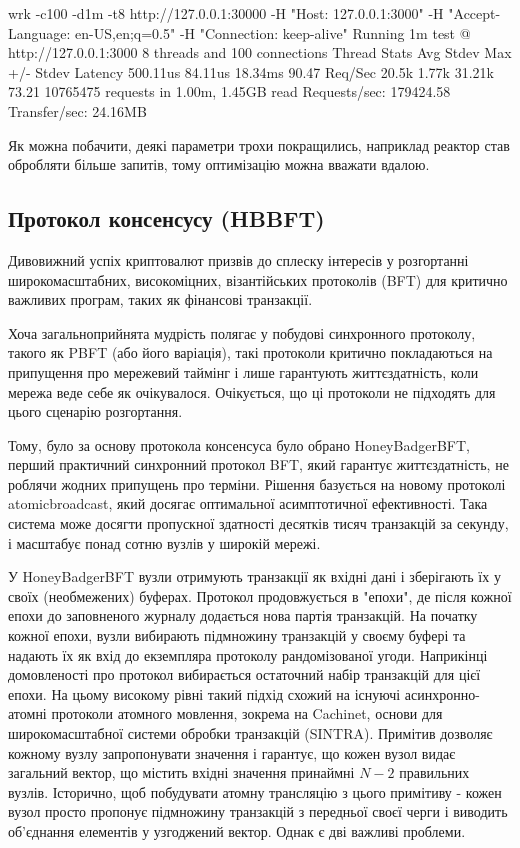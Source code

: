 \documentclass{lib/styles/default-style}
\begin{document}
    \begin{snippet}
        wrk -c100 -d1m -t8 http://127.0.0.1:30000 -H "Host: 127.0.0.1:3000" -H "Accept-Language: en-US,en;q=0.5" -H "Connection: keep-alive"
        Running 1m test @ http://127.0.0.1:3000
        8 threads and 100 connections
        Thread Stats   Avg      Stdev     Max   +/- Stdev
            Latency   500.11us   84.11us  18.34ms   90.47%
            Req/Sec    20.5k     1.77k   31.21k    73.21%
        10765475 requests in 1.00m, 1.45GB read
        Requests/sec:  179424.58
        Transfer/sec:     24.16MB
    \end{snippet}

    Як можна побачити, деякі параметри трохи покращились, наприклад реактор став обробляти більше запитів, тому оптимізацію можна вважати вдалою.

\subsection{Протокол консенсусу (HBBFT)}

    Дивовижний успіх криптовалют призвів до сплеску інтересів у розгортанні широкомасштабних,
    високоміцних, візантійських протоколів (BFT) для критично важливих програм,
    таких як фінансові транзакції.
    
    Хоча загальноприйнята мудрість полягає у побудові синхронного протоколу, такого як PBFT (або його варіація),
    такі протоколи критично покладаються на припущення про мережевий таймінг і лише гарантують життєздатність,
    коли мережа веде себе як очікувалося. Очікується, що ці протоколи не підходять для цього сценарію розгортання.
    
    Тому, було за основу протокола консенсуса було обрано HoneyBadgerBFT,
    перший практичний синхронний протокол BFT, який гарантує життєздатність,
    не роблячи жодних припущень про терміни. Рішення базується на новому протоколі atomicbroadcast,
    який досягає оптимальної асимптотичної ефективності. Така система може досягти пропускної здатності десятків тисяч транзакцій за секунду,
    і масштабує понад сотню вузлів у широкій мережі.

    У HoneyBadgerBFT вузли отримують транзакції як вхідні дані і зберігають їх у своїх
    (необмежених) буферах.
    Протокол продовжується в "епохи", де після кожної епохи до заповненого журналу додається нова партія транзакцій.
    На початку кожної епохи, вузли вибирають підмножину транзакцій у своєму буфері
    та надають їх як вхід до екземпляра протоколу рандомізованої угоди.
    Наприкінці домовленості про протокол вибирається остаточний набір транзакцій для цієї епохи.
    На цьому високому рівні такий підхід схожий на існуючі асинхронно-атомні протоколи атомного мовлення,
    зокрема на Cachinet, основи для широкомасштабної системи обробки транзакцій (SINTRA).
    Примітив дозволяє кожному вузлу запропонувати значення і гарантує, що кожен вузол видає загальний вектор,
    що містить вхідні значення принаймні $N-2$ правильних вузлів.
    Історично, щоб побудувати атомну трансляцію з цього примітиву - кожен вузол просто пропонує підмножину транзакцій
    з передньої своєї черги і виводить об'єднання елементів у узгоджений вектор. Однак є дві важливі проблеми.
\end{document}
